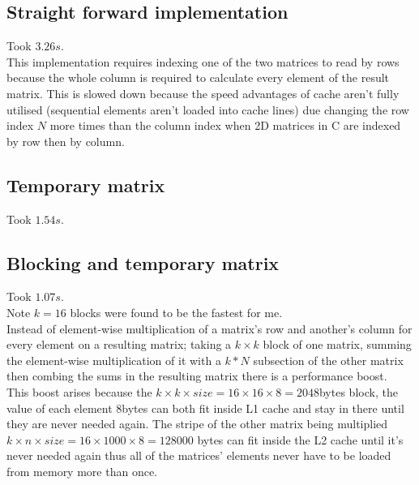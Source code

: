\documentclass[10pt,a4paper]{article}
\begin{document}
    \subsection{Straight forward implementation}
    Took $3.26s$.\\
    This implementation requires indexing one of the two matrices to read by rows because the whole column is required to calculate every element of the result matrix. This is slowed down because the speed advantages of cache aren't fully utilised (sequential elements aren't loaded into cache lines) due changing the row index $N$ more times than the column index when 2D matrices in C are indexed by row then by column. \\
    \subsection{Temporary matrix}
    Took $1.54s$.
    \subsection{Blocking and temporary matrix}
    Took $1.07s$.\\
    Note $k=16$ blocks were found to be the fastest for me.\\
    Instead of element-wise multiplication of a matrix's row and another's column for every element on a resulting matrix; taking a $k\times k$ block of one matrix, summing the element-wise multiplication of it with a $k*N$ subsection of the other matrix then combing the sums in the resulting matrix there is a performance boost.\\
    This boost arises because the $k\times k\times size=16\times 16\times 8=2048$bytes block, the value of each element $8$bytes can both fit inside L1 cache and stay in there until they are never needed again. The stripe of the other matrix being multiplied $k\times n\times size=16\times 1000\times 8=128000$ bytes can fit inside the L2 cache until it's never needed again thus all of the matrices' elements never have to be loaded from memory more than once.
\end{document}
